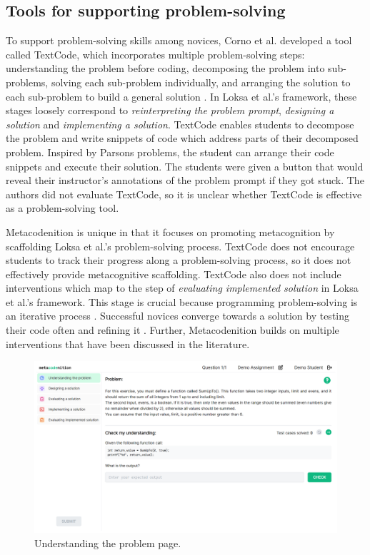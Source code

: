 \documentclass[sigconf,anonymous]{acmart}
\begin{document}
\subsection{Tools for supporting problem-solving} \label{sec:relatedwork-tools}
To support problem-solving skills among novices, Corno et al. developed a tool called TextCode, which incorporates multiple problem-solving steps: understanding the problem before coding, decomposing the problem into sub-problems, solving each sub-problem individually, and arranging the solution to each sub-problem to build a general solution \cite{corno2021}. In Loksa et al.'s framework, these stages loosely correspond to \emph{reinterpreting the problem prompt}, \emph{designing a solution} and \emph{implementing a solution}. TextCode enables students to decompose the problem and write snippets of code which address parts of their decomposed problem. Inspired by Parsons problems, the student can arrange their code snippets and execute their solution. The students were given a button that would reveal their instructor's annotations of the problem prompt if they got stuck. The authors did not evaluate TextCode, so it is unclear whether TextCode is effective as a problem-solving tool.

Metacodenition is unique in that it focuses on promoting metacognition by scaffolding Loksa et al.'s problem-solving process. TextCode does not encourage students to track their progress along a problem-solving process, so it does not effectively provide metacognitive scaffolding. TextCode also does not include interventions which map to the step of \emph{evaluating implemented solution} in Loksa et al.'s framework. This stage is crucial because programming problem-solving is an iterative process \cite{loksa2016}. Successful novices converge towards a solution by testing their code often and refining it \cite{hanks2009}. Further, Metacodenition builds on multiple interventions that have been discussed in the literature.



\begin{figure}[h!]
  \centering
  \includegraphics[width=\linewidth]{understanding-the-problem}
  \caption{Understanding the problem page.}
  \label{fig:understanding}
\end{figure}
\end{document}
